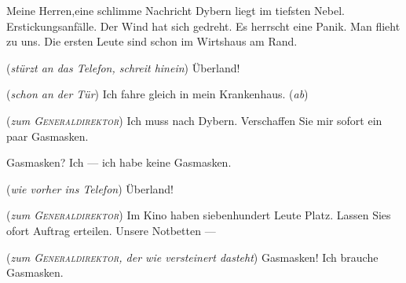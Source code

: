 \documentclass[
	final,
	a4paper,
	ngerman,
	mpinclude = true, %
	twoside = true,
	open = right,
	cleardoublepage = plain,
	DIV = 13,
	BCOR = 1cm,
	titlepage = firstiscover,
	]{scrbook}
\newcommand{\direction}[1]{(\textit{#1})}
\newcommand{\thecharacter}[1]{\textup{\textsc{#1}}\xspace}
\newcommand{\theGeneraldirektor}{\thecharacter{Generaldirektor}}
\newcommand{\theAlexis}{\thecharacter{Alexis}}
\newcommand{\theThomsen}{\thecharacter{Thomsen}}
\newcommand{\theJonas}{\thecharacter{Jonas}}
\newcommand{\theSalwin}{\thecharacter{Salwin}}
\newcommand{\character}[1]{\item[#1]}
\newcommand{\Generaldirektor}{\character{Direktor}}
\newcommand{\Alexis}{\character{\theAlexis}}
\newcommand{\Thomsen}{\character{\theThomsen}}
\newcommand{\Jonas}{\character{\theJonas}}
\newcommand{\Salwin}{\character{\theSalwin}}
\begin{document}
\begin{play}
Meine Herren,eine schlimme Nachricht Dybern liegt im tiefsten Nebel. Erstickungsanfälle. Der Wind hat sich gedreht. Es herrscht eine Panik. Man flieht zu uns. Die ersten Leute sind schon im Wirtshaus am Rand.

\Salwin
\direction{stürzt an das Telefon, schreit hinein} Überland!

\Thomsen
\direction{schon an der Tür} Ich fahre gleich in mein Krankenhaus. \direction{ab}

\Jonas
\direction{zum \theGeneraldirektor} Ich muss nach Dybern. Verschaffen Sie mir sofort ein paar Gasmasken.

\Generaldirektor
Gasmasken? Ich --- ich habe keine Gasmasken.

\Salwin
\direction{wie vorher ins Telefon} Überland!

\Alexis
\direction{zum \theGeneraldirektor} Im Kino haben siebenhundert Leute Platz. Lassen Sies ofort Auftrag erteilen. Unsere Notbetten ---

\Jonas
\direction{zum \theGeneraldirektor, der wie versteinert dasteht} Gasmasken! Ich brauche Gasmasken.
\end{play}

\end{document}
